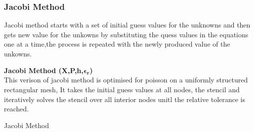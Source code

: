 \subsubsection{Jacobi Method}
Jacobi method starts with a set of initial guess values for the unknowns and then gets new value for the unkowns by substituting the quess values in the equations one at a time,the process is repeated with the newly produced value of the unkowns.\\[2mm]
\begin{algorithm}[H]
    \textbf{Jacobi Method (X,P,h,$\mathbf{\epsilon_r}$)}\\[-1pt]  
    This verison of jacobi method is optimised for poisson on a uniformly structured rectangular mesh, It takes the initial guess values at all nodes, the stencil and iteratively solves the stencil over all interior nodes unitl the relative tolerance is reached.  \\[2mm]
    \caption{Jacobi Method}
\end{algorithm}


